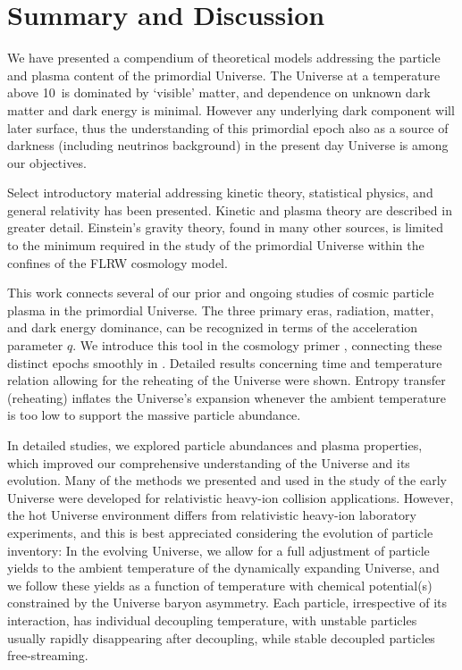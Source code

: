 \section{Summary and Discussion}\label{ part6}
We have presented a compendium of theoretical models addressing the particle and plasma content of the primordial Universe. The Universe at a temperature above 10\keV\ is dominated by `visible' matter, and dependence on unknown dark matter and dark energy is minimal. However any underlying dark component will later surface, thus the understanding of this primordial epoch also as a source of darkness (including neutrinos background) in the present day Universe is among our objectives.

Select introductory material addressing kinetic theory, statistical physics, and general relativity has been presented. Kinetic and plasma theory are described in greater detail. Einstein's gravity theory, found in many other sources, is limited to the minimum required in the study of the primordial Universe within the confines of the FLRW cosmology model. 

This work connects several of our prior and ongoing studies of cosmic particle plasma in the primordial Universe. The three primary eras, radiation, matter, and dark energy dominance, can be recognized in terms of the acceleration parameter $q$. We introduce this tool in the cosmology primer , connecting these distinct epochs smoothly in . Detailed results concerning time and temperature relation allowing for the reheating of the Universe were shown. Entropy transfer (reheating) inflates the Universe's expansion whenever the ambient temperature is too low to support the massive particle abundance.

In detailed studies, we explored particle abundances and plasma properties, which improved our comprehensive understanding of the Universe and its evolution. {\color{blue} Many of the methods we presented and used in the study of the early Universe were developed for relativistic heavy-ion collision applications. However, the hot Universe environment differs from relativistic heavy-ion laboratory experiments, and this is best appreciated considering the evolution of particle inventory: In the evolving Universe, we allow for a full adjustment of particle yields to the ambient temperature of the dynamically expanding Universe, and we follow these yields as a function of temperature with chemical potential(s) constrained by the Universe baryon asymmetry. Each particle, irrespective of its interaction, has individual decoupling temperature, with unstable particles usually rapidly disappearing after decoupling, while stable decoupled particles free-streaming.} 

